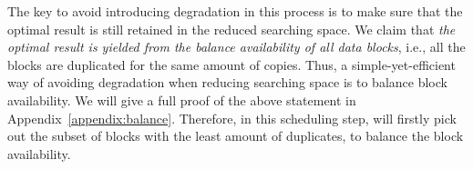 The key to avoid introducing degradation in this process is to make sure that the optimal result is still retained in the reduced searching space.
We claim that {\em the optimal result is yielded from the balance availability of all data blocks}, i.e., all the blocks are duplicated for the same amount of copies. Thus, a simple-yet-efficient way of avoiding degradation when reducing searching space is to balance block availability. We will give a full proof of the above statement in Appendix~\Section\ref{appendix:balance}.
Therefore, in this scheduling step, \name will firstly pick out the subset of blocks with the least amount of duplicates, to balance the block availability.


